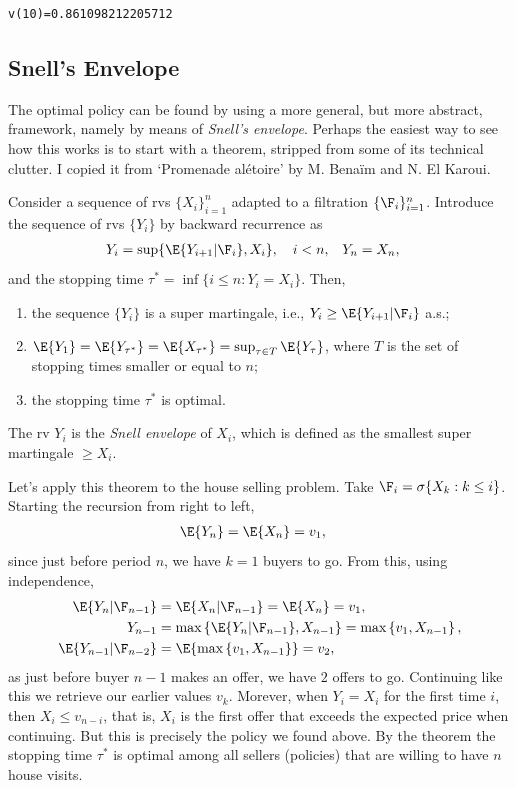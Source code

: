 \documentclass[a4paper]{article}
\begin{document}
\begin{verbatim}
v(10)=0.861098212205712
\end{verbatim}
\subsection{Snell's Envelope}
\label{sec:orge83c40e}

The optimal policy can be found by using a more general, but more abstract, framework, namely by means of \emph{Snell's envelope}.
Perhaps the easiest way to see how this works is to start with a theorem, stripped from some of its technical clutter.
I  copied it from `Promenade alétoire' by M. Benaïm and N. El Karoui.

\label{th:snell}
\begin{theorem}
Consider a sequence of rvs \(\{X_i\}_{i=1}^n\) adapted to a filtration \(\{\F_{i}\}_{i=1}^{n}\).
Introduce the sequence of rvs \(\{Y_i\}\) by backward recurrence as
\begin{align*}
Y_i &= \sup\{\E{Y_{i+1}|\F_{i}}, X_{i}\}, \quad i < n,  & Y_n &= X_{n},
\end{align*}
and the stopping time \(\tau^*= \inf\{ i\leq n: Y_i = X_i\}\). Then,
\begin{enumerate}
\item the sequence \(\{Y_i\}\) is a super martingale, i.e., \(Y_i \geq \E{Y_{i+1} | \F_{i}}\) a.s.;
\item \(\E{Y_1} = \E{Y_{\tau^*}} = \E{X_{\tau^*}} = \sup_{\tau\in T} \E{Y_\tau}\),
where \(T\) is the set of stopping times smaller or equal to \(n\);
\item the stopping time \(\tau^{*}\) is optimal.
\end{enumerate}
The rv \(Y_i\) is the \emph{Snell envelope} of \(X_i\), which is defined as the smallest super martingale  \(\geq X_i\).
\end{theorem}


Let's apply this theorem to the house selling problem. Take \(\F_{i} = \sigma\{X_k : k \leq i\}\). Starting the recursion from right to left,
\begin{align*}
\E{Y_{n}} &= \E{X_{n}} = v_{1},
\end{align*}
since just before period \(n\), we have \(k=1\) buyers to go. From this,  using independence,
\begin{align*}
\E{Y_{n} |\F_{n-1}} &= \E{X_{n}|\F_{n-1}} = \E{X_{n}} = v_{1}, \\
Y_{n-1} &= \max{\E{Y_{n} |\F_{n-1}}, X_{n-1}} = \max{v_1, X_{n-1}}, \\
\E{Y_{n-1}|\F_{n-2}} &= \E{\max{v_1, X_{n-1}}} = v_{2},
\end{align*}
as just before buyer \(n-1\) makes an offer, we have \(2\) offers to go.
Continuing like this we retrieve our earlier values \(v_k\).
Morever, when \(Y_i = X_i\) for the first time \(i\), then \(X_i \leq v_{n-i}\), that is, \(X_i\) is the first offer that exceeds the expected price when continuing.
But this is precisely the policy we found above.
By the theorem the stopping time \(\tau^*\) is optimal among all sellers (policies) that are willing to have \(n\) house visits.
\end{document}
